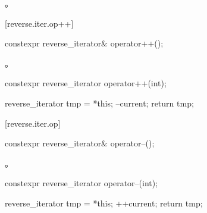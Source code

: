 \begin{itemdescr}
\pnum
\returns {}。
\end{itemdescr}

[reverse.iter.op++]{}

%
\begin{itemdecl}
constexpr reverse_iterator& operator++();
\end{itemdecl}

\begin{itemdescr}
\pnum
\effects
{}

\pnum
\returns
{}。
\end{itemdescr}

%
%
\begin{itemdecl}
constexpr reverse_iterator operator++(int);
\end{itemdecl}

\begin{itemdescr}
\pnum
\effects
\begin{codeblock}
reverse_iterator tmp = *this;
--current;
return tmp;
\end{codeblock}
\end{itemdescr}

[reverse.iter.op\dcr]{}

%
\begin{itemdecl}
constexpr reverse_iterator& operator--();
\end{itemdecl}

\begin{itemdescr}
\pnum
\effects
{}

\pnum
\returns
{}。
\end{itemdescr}

%
%
\begin{itemdecl}
constexpr reverse_iterator operator--(int);
\end{itemdecl}

\begin{itemdescr}
\pnum
\effects
\begin{codeblock}
reverse_iterator tmp = *this;
++current;
return tmp;
\end{codeblock}
\end{itemdescr}


